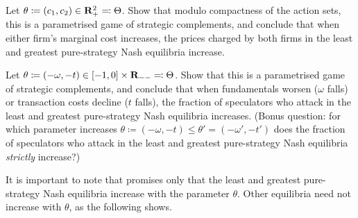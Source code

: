 \begin{namedthm}
	\label{exercise:bertrand_spm_diff_param}
	Let $\theta \coloneqq (c_1,c_2) \in \mathbf{R}_+^2 \eqqcolon \Theta$. Show that modulo compactness of the action sets, this is a parametrised game of strategic complements, and conclude that when either firm's marginal cost increases, the prices charged by both firms in the least and greatest pure-strategy Nash equilibria increase.
\end{namedthm}

\begin{namedthm}
	\label{exercise:coordinated_attack_param}
	Let $\theta \coloneqq (-\omega,-t) \in [-1,0] \times \mathbf{R}_{--} \eqqcolon \Theta$. Show that this is a parametrised game of strategic complements, and conclude that when fundamentals worsen ($\omega$ falls) or transaction costs decline ($t$ falls), the fraction of speculators who attack in the least and greatest pure-strategy Nash equilibria increases. (Bonus question: for which parameter increases $\theta \coloneqq (-\omega,-t) \leq \theta' = (-\omega',-t')$ does the fraction of speculators who attack in the least and greatest pure-strategy Nash equilibria \emph{strictly} increase?)
\end{namedthm}

It is important to note that  promises only that the least and greatest pure-strategy Nash equilibria increase with the parameter $\theta$. Other equilibria need not increase with $\theta$, as the following shows.

